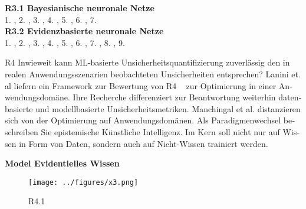\begin{otherlanguage}{ngerman}
{\begin{minipage}[t]{\textwidth}
\textbf{R3.1 Bayesianische neuronale Netze}\\
1. \parencite[Kap.~2.3]{gal2016uncertainty},
2. \parencite[Kap.~3]{blundell2015weight},
3. \parencite[S.~40–41]{gal2016uncertainty},
4. \parencite[S.~41–42]{gal2016uncertainty},
5. \parencite[Kap.~7.4]{rasmussen2006gaussian},
6. \parencite[S.~16]{bishop2006pattern},
7. \parencite[S.~29–31]{gal2016uncertainty} \\[0.125em]

\textbf{R3.2 Evidenzbasierte neuronale Netze}\\
1. \parencite{sensoy2018evidential},
2. \parencite[S.~3–4]{sensoy2018evidential},
3. \parencite[S.~4]{sensoy2018evidential},
4. \parencite[S.~5]{sensoy2018evidential},
5. \parencite[S.~6]{sensoy2018evidential},
6. \parencite[S.~6–7]{sensoy2018evidential},
7. \parencite{kendall2017uncertainties},
8. \parencite{kendall2017uncertainties},
9. \parencite[S.~6]{sensoy2018evidential}
\end{minipage}%
}

\pagebreak


R4 Inwieweit kann ML-basierte Unsicherheitsquantifizierung zuverlässig den in realen Anwendungsszenarien beobachteten Unsicherheiten entsprechen?
\newline
Lanini et. al liefern ein Framework zur Bewertung von R4 ~\parencite{Lanini2024} zur Optimierung in einer Anwendungsdomäne. Ihre Recherche differenziert zur Beantwortung weiterhin datenbasierte und modellbasierte Unsicherheitsmetriken. 
\newline
Manchingal et al. distanzieren sich von der Optimierung auf Anwendungsdomänen. Als Paradigmenwechsel beschreiben Sie epistemische Künstliche Intelligenz. Im Kern soll nicht nur auf Wissen in Form von Daten, sondern auch auf Nicht-Wissen trainiert werden. \parencite{manchingal2025}


\pagebreak


\textbf{Model Evidentielles Wissen}

\begin{figure}[!ht]
  \centering
  \texttt{[image: ../figures/x3.png]}
  \caption{R4.1}
\end{figure}


\end{otherlanguage}
